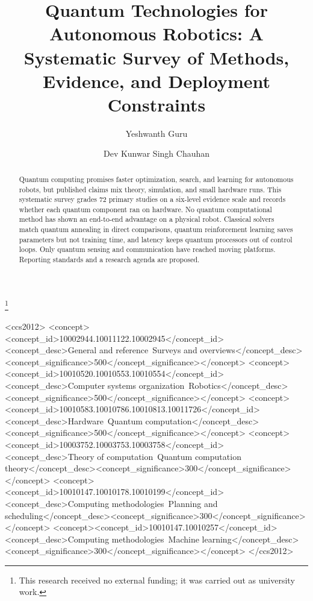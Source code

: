 \documentclass[acmsmall,screen,review]{acmart}
\begin{document}
\title[Quantum Technologies for Autonomous Robotics: A Systematic Survey]{Quantum Technologies for Autonomous Robotics: A Systematic Survey of Methods, Evidence, and Deployment Constraints}
\thanks{This research received no external funding; it was carried out as university work.}
\author{Yeshwanth Guru}

\author{Dev Kunwar Singh Chauhan}

\renewcommand{\shortauthors}{Guru and Chauhan}
\begin{abstract}
Quantum computing promises faster optimization, search, and learning for autonomous robots, but published claims mix theory, simulation, and small hardware runs. This systematic survey grades 72 primary studies on a six-level evidence scale and records whether each quantum component ran on hardware. No quantum computational method has shown an end-to-end advantage on a physical robot. Classical solvers match quantum annealing in direct comparisons, quantum reinforcement learning saves parameters but not training time, and latency keeps quantum processors out of control loops. Only quantum sensing and communication have reached moving platforms. Reporting standards and a research agenda are proposed.
\end{abstract}

\begin{CCSXML}
<ccs2012>
   <concept><concept_id>10002944.10011122.10002945</concept_id><concept_desc>General and reference~Surveys and overviews</concept_desc><concept_significance>500</concept_significance></concept>
   <concept><concept_id>10010520.10010553.10010554</concept_id><concept_desc>Computer systems organization~Robotics</concept_desc><concept_significance>500</concept_significance></concept>
   <concept><concept_id>10010583.10010786.10010813.10011726</concept_id><concept_desc>Hardware~Quantum computation</concept_desc><concept_significance>500</concept_significance></concept>
   <concept><concept_id>10003752.10003753.10003758</concept_id><concept_desc>Theory of computation~Quantum computation theory</concept_desc><concept_significance>300</concept_significance></concept>
   <concept><concept_id>10010147.10010178.10010199</concept_id><concept_desc>Computing methodologies~Planning and scheduling</concept_desc><concept_significance>300</concept_significance></concept>
   <concept><concept_id>10010147.10010257</concept_id><concept_desc>Computing methodologies~Machine learning</concept_desc><concept_significance>300</concept_significance></concept>
</ccs2012>
\end{CCSXML}
\end{document}
